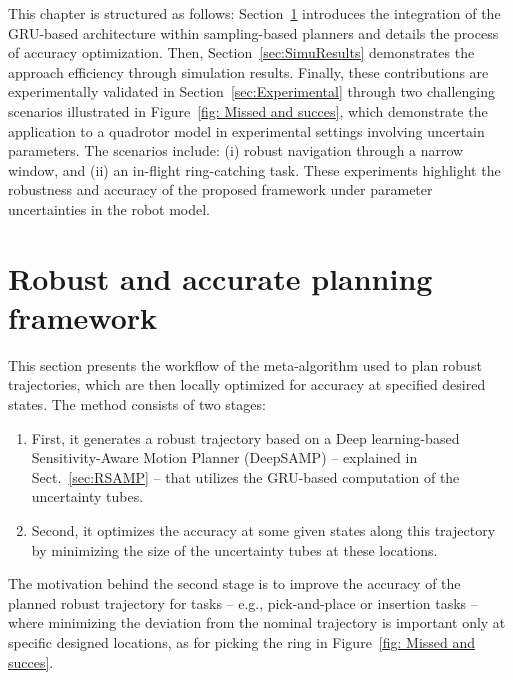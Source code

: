 This chapter is structured as follows: Section~\ref{sec:RASAMP} introduces the integration of the GRU-based architecture within sampling-based planners and details the process of accuracy optimization.
Then, Section~\ref{sec:SimuResults} demonstrates the approach efficiency through simulation results.
Finally, these contributions are experimentally validated in Section~\ref{sec:Experimental} through two challenging scenarios illustrated in Figure~\ref{fig: Missed and succes}, which demonstrate the application to a quadrotor model in experimental settings involving uncertain parameters. 
The scenarios include: (i) robust navigation through a narrow window, and (ii) an in-flight ring-catching task. 
These experiments highlight the robustness and accuracy of the proposed framework under parameter uncertainties in the robot model.


\section{Robust and accurate planning framework}\label{sec:RASAMP}

This section presents the workflow of the meta-algorithm used to plan robust trajectories, which are then locally optimized for accuracy at specified desired states. 
The method consists of two stages: 
\begin{enumerate}
    \item First, it generates a robust trajectory based on a Deep learning-based Sensitivity-Aware Motion Planner (DeepSAMP) -- explained in Sect.~\ref{sec:RSAMP} -- that utilizes the GRU-based computation of the uncertainty tubes.
    \item Second, it optimizes the accuracy at some given states along this trajectory by minimizing the size of the uncertainty tubes at these locations.
\end{enumerate}

The motivation behind the second stage is to improve the accuracy of the planned robust trajectory for tasks -- e.g., pick-and-place or insertion tasks -- where minimizing the deviation from the nominal trajectory is important only at specific designed locations, as for picking the ring in Figure~\ref{fig: Missed and succes}.

